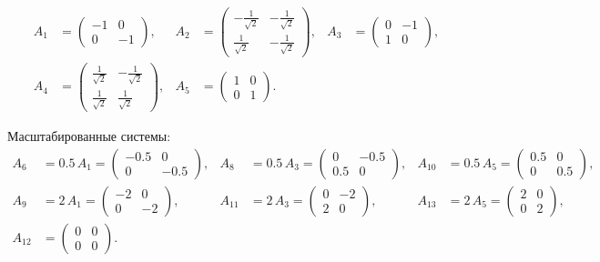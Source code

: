 \begin{align}
A_1 &= \begin{pmatrix} -1 & 0 \\ 0 & -1 \end{pmatrix}, &
A_2 &= \begin{pmatrix} -\tfrac{1}{\sqrt{2}} & -\tfrac{1}{\sqrt{2}} \\ \tfrac{1}{\sqrt{2}} & -\tfrac{1}{\sqrt{2}} \end{pmatrix}, &
A_3 &= \begin{pmatrix} 0 & -1 \\ 1 & 0 \end{pmatrix}, \\
A_4 &= \begin{pmatrix} \tfrac{1}{\sqrt{2}} & -\tfrac{1}{\sqrt{2}} \\ \tfrac{1}{\sqrt{2}} & \tfrac{1}{\sqrt{2}} \end{pmatrix}, &
A_5 &= \begin{pmatrix} 1 & 0 \\ 0 & 1 \end{pmatrix}. &&
\end{align}

Масштабированные системы:
\begin{align}
A_6 &= 0.5\,A_1 = \begin{pmatrix} -0.5 & 0 \\ 0 & -0.5 \end{pmatrix}, &
A_8 &= 0.5\,A_3 = \begin{pmatrix} 0 & -0.5 \\ 0.5 & 0 \end{pmatrix}, &
A_{10} &= 0.5\,A_5 = \begin{pmatrix} 0.5 & 0 \\ 0 & 0.5 \end{pmatrix}, \\
A_9 &= 2\,A_1 = \begin{pmatrix} -2 & 0 \\ 0 & -2 \end{pmatrix}, &
A_{11} &= 2\,A_3 = \begin{pmatrix} 0 & -2 \\ 2 & 0 \end{pmatrix}, &
A_{13} &= 2\,A_5 = \begin{pmatrix} 2 & 0 \\ 0 & 2 \end{pmatrix}, \\
A_{12} &= \begin{pmatrix} 0 & 0 \\ 0 & 0 \end{pmatrix}. &&
\end{align}

